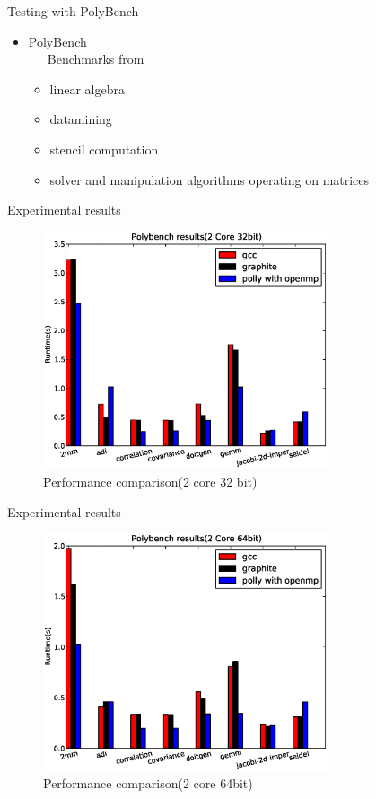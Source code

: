 \documentclass{beamer}
\begin{document}
\begin{frame}{Testing with PolyBench}
\begin{itemize}
\item PolyBench \\
	\ \ \ Benchmarks from
	\begin{itemize}
	\item linear algebra
	\item datamining
	\item stencil computation
	\item solver and manipulation algorithms operating on matrices
	\end{itemize}
\end{itemize}
\end{frame}

\begin{frame}{Experimental results}
\begin{figure}
\begin{center}
  \includegraphics[height=7cm]{images/2core32bit.eps}
  \caption{Performance comparison(2 core 32 bit)}
  \label{fig:2core1}
\end{center}
\end{figure}
\end{frame}

\begin{frame}{Experimental results}
\begin{figure}
\begin{center}
  \includegraphics[height=7cm]{images/2core64bit.eps}
  \caption{Performance comparison(2 core 64bit)}
  \label{fig:2core2}
\end{center}
\end{figure}
\end{frame}
\end{document}
